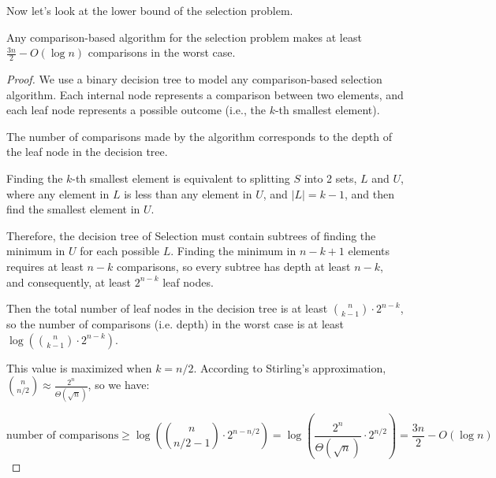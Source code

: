 Now let's look at the lower bound of the selection problem.
\begin{theorem}
	Any comparison-based algorithm for the selection problem makes at least $\frac{3n}{2}-O(\log n)$ comparisons in the worst case.
\end{theorem}
\begin{proof}
	We use a binary decision tree to model any comparison-based selection algorithm. Each internal node represents a comparison between two elements, and each leaf node represents a possible outcome (i.e., the $k$-th smallest element).


	The number of comparisons made by the algorithm corresponds to the depth of the leaf node in the decision tree.

	Finding the $k$-th smallest element is equivalent to splitting $S$ into 2 sets, $L$ and $U$, where any element in $L$ is less than any element in $U$, and $|L| = k-1$, and then find the smallest element in $U$.

	Therefore, the decision tree of Selection must contain subtrees of finding the minimum in $U$ for each possible $L$. Finding the minimum in $n-k+1$ elements requires at least $n-k$ comparisons, so every subtree has depth at least $n-k$, and consequently, at least $2^{n-k}$ leaf nodes.

	Then the total number of leaf nodes in the decision tree is at least $\binom{n}{k-1} \cdot 2^{n-k}$, so the number of comparisons (i.e. depth) in the worst case is at least $\log \left( \binom{n}{k-1} \cdot 2^{n-k} \right)$.

	This value is maximized when $k = n/2$. According to Stirling's approximation, $\binom{n}{n/2} \approx \frac{2^n}{\Theta(\sqrt{n})}$, so we have:

	\[
		\text{number of comparisons} \geq \log \left( \binom{n}{n/2 - 1} \cdot 2^{n - n/2} \right) = \log \left( \frac{2^n}{\Theta(\sqrt{n})} \cdot 2^{n/2} \right) = \frac{3n}{2} - O(\log n)
	\]

\end{proof}


